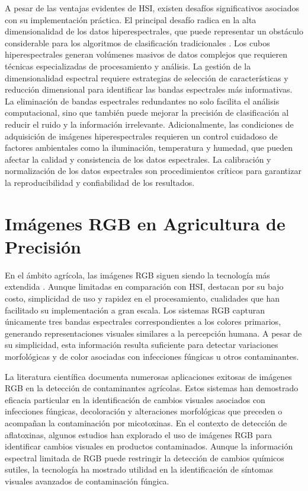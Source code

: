 A pesar de las ventajas evidentes de HSI, existen desafíos significativos asociados con su implementación práctica. El principal desafío radica en la alta dimensionalidad de los datos hiperespectrales, que puede representar un obstáculo considerable para los algoritmos de clasificación tradicionales \cite{HONG201935}. Los cubos hiperespectrales generan volúmenes masivos de datos complejos que requieren técnicas especializadas de procesamiento y análisis. La gestión de la dimensionalidad espectral requiere estrategias de selección de características y reducción dimensional para identificar las bandas espectrales más informativas. La eliminación de bandas espectrales redundantes no solo facilita el análisis computacional, sino que también puede mejorar la precisión de clasificación al reducir el ruido y la información irrelevante. Adicionalmente, las condiciones de adquisición de imágenes hiperespectrales requieren un control cuidadoso de factores ambientales como la iluminación, temperatura y humedad, que pueden afectar la calidad y consistencia de los datos espectrales. La calibración y normalización de los datos espectrales son procedimientos críticos para garantizar la reproducibilidad y confiabilidad de los resultados.

\section{Imágenes RGB en Agricultura de Precisión}

En el ámbito agrícola, las imágenes RGB siguen siendo la tecnología más extendida \cite{FERENTINOS2018311}. Aunque limitadas en comparación con HSI, destacan por su bajo costo, simplicidad de uso y rapidez en el procesamiento, cualidades que han facilitado su implementación a gran escala. Los sistemas RGB capturan únicamente tres bandas espectrales correspondientes a los colores primarios, generando representaciones visuales similares a la percepción humana. A pesar de su simplicidad, esta información resulta suficiente para detectar variaciones morfológicas y de color asociadas con infecciones fúngicas u otros contaminantes.

\vspace{5mm}

La literatura científica documenta numerosas aplicaciones exitosas de imágenes RGB en la detección de contaminantes agrícolas. Estos sistemas han demostrado eficacia particular en la identificación de cambios visuales asociados con infecciones fúngicas, decoloración y alteraciones morfológicas que preceden o acompañan la contaminación por micotoxinas. En el contexto de detección de aflatoxinas, algunos estudios han explorado el uso de imágenes RGB para identificar cambios visuales en productos contaminados. Aunque la información espectral limitada de RGB puede restringir la detección de cambios químicos sutiles, la tecnología ha mostrado utilidad en la identificación de síntomas visuales avanzados de contaminación fúngica.


